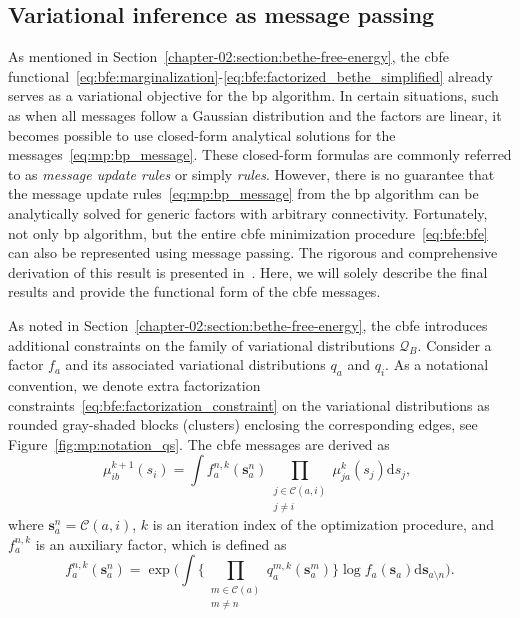 \subsection{Variational inference as message passing}

As mentioned in Section~\ref{chapter-02:section:bethe-free-energy}, the \ac{cbfe} functional~\eqref{eq:bfe:marginalization}-\eqref{eq:bfe:factorized_bethe_simplified} already
serves as a variational objective for the \ac{bp} algorithm.
In certain situations, such as when all messages follow a Gaussian distribution and the
factors are linear, it becomes possible to use closed-form analytical solutions for the
messages~\eqref{eq:mp:bp_message}.
These closed-form formulas are commonly referred to as \textit{message update rules} or simply
\textit{rules}.
However, there is no guarantee that the message update rules~\eqref{eq:mp:bp_message} from the \ac{bp} algorithm can be analytically solved for generic factors with arbitrary connectivity.
Fortunately, not only \ac{bp} algorithm, but the entire \ac{cbfe} minimization procedure~\eqref{eq:bfe:bfe} can 
also be represented using message passing.
The rigorous and comprehensive derivation of this result is presented in~\citep{senoz_variational_2021, senoz_thesis}.
Here, we will solely describe the final results and provide the functional form of the \ac{cbfe}
messages.

As noted in Section~\ref{chapter-02:section:bethe-free-energy}, the \ac{cbfe} introduces additional
constraints on the family of variational distributions $\mathcal{Q}_B$.
Consider a factor $f_a$ and its associated variational distributions $q_a$ and $q_i$.
As a notational convention, we denote extra factorization
constraints~\eqref{eq:bfe:factorization_constraint} on the variational distributions as
rounded gray-shaded blocks (clusters) enclosing the corresponding edges, see
Figure~\ref{fig:mp:notation_qs}.
The \ac{cbfe} messages are derived as \begin{equation}
    \label{eq:mp:vi_message} \mu^{k+1}_{ib}(s_i) = \int f^{n,k}_a(\bm{s}^n_a) \prod_{\substack{j
        \in \mathcal{C}(a, i)\\j \neq i}} \mu^{k}_{ja}(s_j)\mathrm{d}s_j,\,\,
  \end{equation} where $\bm{s}^n_a = \mathcal{C}(a,
  i)$, $k$ is an iteration index of the optimization procedure, and $f^{n,k}_a$ is an auxiliary
factor, which is defined as \begin{equation}
  \label{eq:mp:auxiliary_p} f^{n,k}_a(\bm{s}^n_a) = \exp \Big( \int \Big\{ \prod_{\substack{m
      \in \mathcal{C}(a)\\m \neq n}} q^{m, k}_a(\bm{s}^m_a) \Big\} \log f_a(\bm{s}_a)
  \mathrm{d}\bm{s}_{a \setminus n} \Big).
\end{equation}

